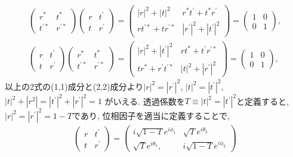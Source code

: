 \documentclass[10pt,a4j]{jarticle}
\begin{document}
\begin{align}
\left(\begin{array}{cc} r^{*} & t^{*} \\ t^{\prime *} & r^{\prime *} \end{array} \right) 
\left(\begin{array}{cc} r & t^{\prime} \\ t & r^{\prime} \end{array} \right) 
= \left( \begin{array}{cc} |r|^2 + |t|^2 & r^{*}t^{\prime}  +   t^{*} r^{\prime}\\
       rt^{\prime *} + t r^{\prime *}  & |r^{\prime}|^2 + |t^{\prime}|^2 \end{array} \right) 
= \left( \begin{array}{cc} 1 & 0 \\ 0 & 1 \end{array} \right),
\label{eq:unitary1} \\
\left(\begin{array}{cc} r & t^{\prime} \\ t & r^{\prime} \end{array} \right) 
\left(\begin{array}{cc} r^{*} & t^{*} \\ t^{\prime *} & r^{\prime *} \end{array} \right) 
= \left( \begin{array}{cc} |r|^2 + |t^\prime|^2 & r t^{*}  +   t^{\prime} r^{\prime*}\\
       t r^* + r^\prime t^{\prime *}  & |t|^2 + |r^{\prime}|^2 \end{array} \right) 
= \left( \begin{array}{cc} 1 & 0 \\ 0 & 1 \end{array} \right), 
\label{eq:unitary2} 
\end{align}
以上の2式の(1,1)成分と(2,2)成分より$|r|^2  = |r^\prime|^2$, $|t|^2 = |t^{\prime}|^2$, $|t|^2 + |r^2| = |t^\prime|^2 + |r^\prime|^2 = 1$
がいえる. 透過係数を$T\equiv |t|^2 = |t^{\prime}|^2$と定義すると, $|r|^2  = |r^\prime|^2 = 1-T$であり, 
位相因子を適当に定義することで, 
\begin{align}
\left( \begin{array}{cc} r & t^{\prime} \\ t & r^{\prime} \end{array} \right)
= \left( \begin{array}{cc} i\sqrt{1-T}e^{i \phi_1} & \sqrt{T}e^{i \theta_2} 
\\ \sqrt{T}e^{i \theta_1}, & i\sqrt{1-T}e^{i \phi_2} \end{array} \right)
\end{align}
\end{document}
